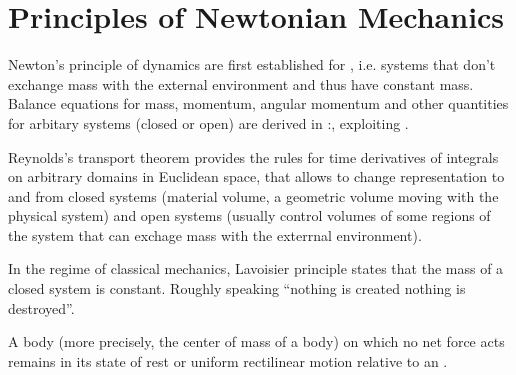 \documentclass[letterpaper,10pt,english]{jupyterBook}
\begin{document}
\section{Principles of Newtonian Mechanics}
\label{\detokenize{ch/dynamics-principles:principles-of-newtonian-mechanics}}\label{\detokenize{ch/dynamics-principles:classical-mechanics-dynamics-principles}}\label{\detokenize{ch/dynamics-principles::doc}}
\sphinxAtStartPar
Newton’s principle of dynamics are first established for , i.e. systems that don’t exchange mass with the external environment and thus have constant mass.
Balance equations for mass, momentum, angular momentum and other quantities for arbitary systems (closed or open) are derived in :, exploiting .%
\begin{footnote}[1]\sphinxAtStartFootnote
Reynolds’s transport theorem provides the rules for time derivatives of integrals on arbitrary domains in Euclidean space, that allows to change representation to and from closed systems (material volume, a geometric volume moving with the physical system) and open systems (usually control volumes of some regions of the system that can exchage mass with the exterrnal environment).
%
\end{footnote}

\sphinxAtStartPar
{} In the regime of classical mechanics, Lavoisier principle states that the mass of a closed system is constant. Roughly speaking “nothing is created nothing is destroyed”.

\sphinxAtStartPar
{} A body (more precisely, the center of mass of a body) on which no net force acts remains in its state of rest or uniform rectilinear motion relative to an {\hyperref[\detokenize{ch/dynamics-principles:classical-mehcanics-dynamics-principles-inertial-ref-frame}]{}}.
\end{document}
